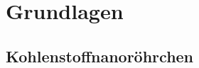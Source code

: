 \chapter{Grundlagen}
\label{cha:grundlagen}

\section{Kohlenstoffnanoröhrchen}
\label{cha:kohlenstoffnanoroehrchen}
